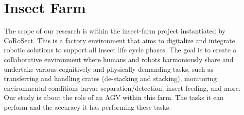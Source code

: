 \section{Insect Farm} \label{???}


The scope of our research is within the insect-farm project instantiated by CoRoSect. This is a factory environment that aims to digitalize and integrate robotic solutions to support all insect life cycle phases. The goal is to create a collaborative environment where humans and robots harmoniously share and undertake various cognitively and physically demanding tasks, such as transferring and handling crates (de-stacking and stacking), monitoring environmental conditions larvae separation/detection, insect feeding, and more. 
Our study is about the role of an AGV within this farm. The tasks it can perform and the accuracy it has performing these tasks. 